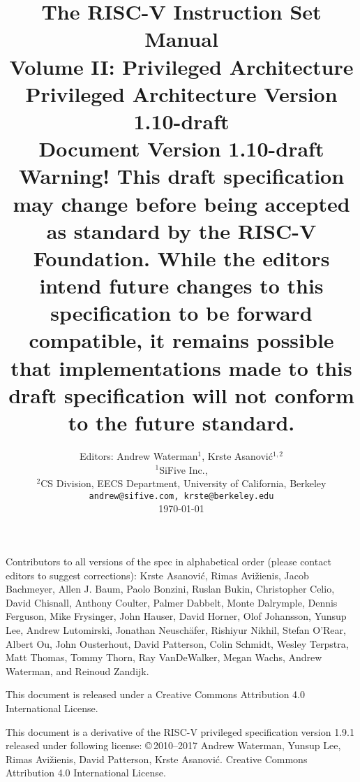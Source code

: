 \documentclass[twoside,11pt]{book}
\newcommand{\privrev}{1.10-draft}
\begin{document}
\title{{\vspace{-0.7in}\Large {\bf The RISC-V Instruction Set Manual}} \\
  \large {\bf Volume II: Privileged Architecture} \\
  Privileged Architecture Version \privrev \\
  Document Version \privrev \\
    {\bf Warning! This draft specification
    may change before being accepted as standard by the RISC-V Foundation.
    While the editors intend future changes to this specification to be
    forward compatible, it remains possible that
    implementations made to this draft specification will not conform
    to the future standard.}
  \vspace{-0.1in}}

\author{Editors: Andrew Waterman$^{1}$, Krste Asanovi\'{c}$^{1,2}$ \\
  $^{1}$SiFive Inc., \\
  $^{2}$CS Division, EECS Department, University of California, Berkeley \\
  {\tt andrew@sifive.com, krste@berkeley.edu} \\
  \today
}

\date{} 
\maketitle

Contributors to all versions of the spec in alphabetical order (please
contact editors to suggest corrections): Krste Asanovi\'{c}, Rimas
Avi\v{z}ienis, Jacob Bachmeyer, Allen J. Baum, Paolo Bonzini, Ruslan
Bukin, Christopher Celio, David Chisnall, Anthony Coulter, Palmer
Dabbelt, Monte Dalrymple, Dennis Ferguson, Mike Frysinger, John
Hauser, David Horner, Olof Johansson, Yunsup Lee, Andrew Lutomirski,
Jonathan Neusch{\"a}fer, Rishiyur Nikhil, Stefan O'Rear, Albert Ou,
John Ousterhout, David Patterson, Colin Schmidt, Wesley Terpstra, Matt
Thomas, Tommy Thorn, Ray VanDeWalker, Megan Wachs, Andrew Waterman,
and Reinoud Zandijk.

This document is released under a Creative Commons Attribution 4.0
International License.

This document is a derivative of the RISC-V
privileged specification version 1.9.1 released under following license:
\copyright \,2010--2017 Andrew Waterman, Yunsup Lee, Rimas
Avi\v{z}ienis, David Patterson, Krste Asanovi\'{c}. 
Creative Commons Attribution 4.0 International License.
\end{document}
